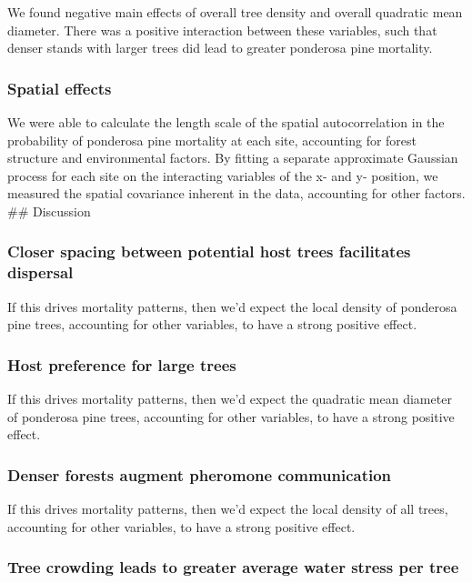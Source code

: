 \documentclass[]{article}
\begin{document}
We found negative main effects of overall tree density and overall
quadratic mean diameter. There was a positive interaction between these
variables, such that denser stands with larger trees did lead to greater
ponderosa pine mortality.

\subsubsection{Spatial effects}\label{spatial-effects}

We were able to calculate the length scale of the spatial
autocorrelation in the probability of ponderosa pine mortality at each
site, accounting for forest structure and environmental factors. By
fitting a separate approximate Gaussian process for each site on the
interacting variables of the x- and y- position, we measured the spatial
covariance inherent in the data, accounting for other factors. \#\#
Discussion

\subsubsection{Closer spacing between potential host trees facilitates
dispersal}\label{closer-spacing-between-potential-host-trees-facilitates-dispersal}

If this drives mortality patterns, then we'd expect the local density of
ponderosa pine trees, accounting for other variables, to have a strong
positive effect.

\subsubsection{Host preference for large
trees}\label{host-preference-for-large-trees}

If this drives mortality patterns, then we'd expect the quadratic mean
diameter of ponderosa pine trees, accounting for other variables, to
have a strong positive effect.

\subsubsection{Denser forests augment pheromone
communication}\label{denser-forests-augment-pheromone-communication}

If this drives mortality patterns, then we'd expect the local density of
all trees, accounting for other variables, to have a strong positive
effect.

\subsubsection{Tree crowding leads to greater average water stress per
tree}\label{tree-crowding-leads-to-greater-average-water-stress-per-tree}
\end{document}
